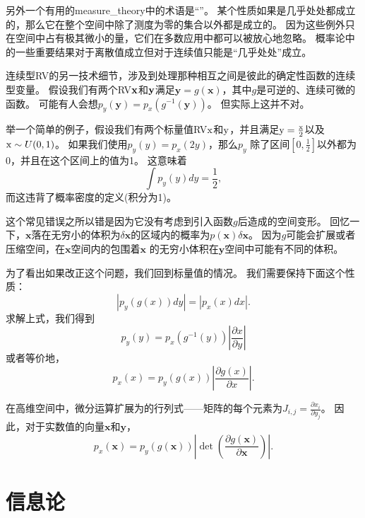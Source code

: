 另外一个有用的\gls{measure_theory}中的术语是``''。
某个性质如果是几乎处处都成立的，那么它在整个空间中除了测度为零的集合以外都是成立的。
因为这些例外只在空间中占有极其微小的量，它们在多数应用中都可以被放心地忽略。
概率论中的一些重要结果对于离散值成立但对于连续值只能是``几乎处处''成立。

连续型\gls{RV}的另一技术细节，涉及到处理那种相互之间是彼此的确定性函数的连续型变量。
假设我们有两个\gls{RV}$\mathbf{x}$和$\mathbf{y}$满足$\bm{y} = g(\bm{x})$，其中$g$是可逆的、连续可微的函数。
可能有人会想$p_y(\bm{y}) = p_x(g^{-1}(\bm{y}))$。
但实际上这并不对。

举一个简单的例子，假设我们有两个标量值\gls{RV}$\mathrm{x}$和$\mathrm{y}$，并且满足$\mathrm{y}= \frac{\mathrm{x}}{2}$以及$\mathrm{x} \sim U(0, 1)$。
如果我们使用$p_y(y) = p_x(2y)$，那么$p_y$ 除了区间$[0, \frac{1}{2}]$以外都为0，并且在这个区间上的值为1。
这意味着
\begin{equation}
\int p_y(y)dy = \frac{1}{2},
\end{equation}
而这违背了概率密度的定义(积分为1)。

这个常见错误之所以错是因为它没有考虑到引入函数$g$后造成的空间变形。
回忆一下，$\bm{x}$落在无穷小的体积为$\delta \bm{x}$的区域内的概率为$p(\bm{x})\delta\bm{x}$。
因为$g$可能会扩展或者压缩空间，在$\bm{x}$空间内的包围着$\bm{x}$ 的无穷小体积在$\bm{y}$空间中可能有不同的体积。


为了看出如果改正这个问题，我们回到标量值的情况。
我们需要保持下面这个性质：
\begin{equation}
|p_y(g(x))dy| = |p_x(x)dx|.
\end{equation}
求解上式，我们得到
\begin{equation}
p_y(y) = p_x(g^{-1}(y)) \left \vert \frac{\partial x}{\partial y} \right \vert
\end{equation}
或者等价地，
\begin{equation}
p_x(x) = p_y(g(x)) \left | \frac{\partial g(x)}{\partial x} \right |.
\end{equation}

在高维空间中，微分运算扩展为的行列式——矩阵的每个元素为$J_{i, j} = \frac{\partial x_i}{\partial y_j}$。
因此，对于实数值的向量$\bm{x}$和$\bm{y}$，
\begin{equation}
p_x(\bm{x}) = p_y(g(\bm{x})) \left | \det \left ( \frac{\partial g(\bm{x})}{\partial \bm{x}} \right) \right |.
\end{equation}

\section{信息论}
\label{sec:information_theory}

